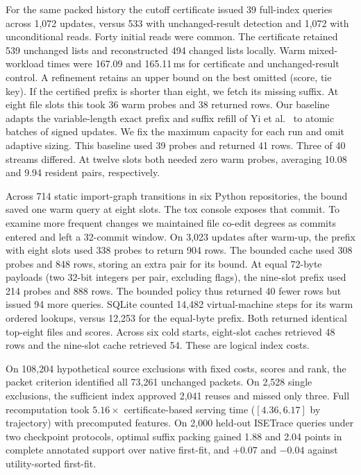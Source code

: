 \documentclass[conference]{IEEEtran}
\begin{document}
For the same packed history the cutoff certificate issued 39 full-index queries across 1,072 updates, versus 533 with unchanged-result detection and 1,072 with unconditional reads. Forty initial reads were common. The certificate retained 539 unchanged lists and reconstructed 494 changed lists locally. Warm mixed-workload times were 167.09 and 165.11\,ms for certificate and unchanged-result control. A refinement retains an upper bound on the best omitted (score, tie key). If the certified prefix is shorter than eight, we fetch its missing suffix. At eight file slots this took 36 warm probes and 38 returned rows. Our baseline adapts the variable-length exact prefix and suffix refill of Yi et al.~\cite{topk} to atomic batches of signed updates. We fix the maximum capacity for each run and omit adaptive sizing. This baseline used 39 probes and returned 41 rows. Three of 40 streams differed. At twelve slots both needed zero warm probes, averaging 10.08 and 9.94 resident pairs, respectively.

Across 714 static import-graph transitions in six Python repositories, the bound saved one warm query at eight slots. The tox console exposes that commit. To examine more frequent changes we maintained file co-edit degrees as commits entered and left a 32-commit window. On 3,023 updates after warm-up, the prefix with eight slots used 338 probes to return 904 rows. The bounded cache used 308 probes and 848 rows, storing an extra pair for its bound. At equal 72-byte payloads (two 32-bit integers per pair, excluding flags), the nine-slot prefix used 214 probes and 888 rows. The bounded policy thus returned 40 fewer rows but issued 94 more queries. SQLite counted 14,482 virtual-machine steps for its warm ordered lookups, versus 12,253 for the equal-byte prefix. Both returned identical top-eight files and scores. Across six cold starts, eight-slot caches retrieved 48 rows and the nine-slot cache retrieved 54. These are logical index costs.

On 108,204 hypothetical source exclusions with fixed costs, scores and rank, the packet criterion identified all 73,261 unchanged packets. On 2,528 single exclusions, the sufficient index approved 2,041 reuses and missed only three. Full recomputation took $5.16\times$ certificate-based serving time ($[4.36,6.17]$ by trajectory) with precomputed features. On 2,000 held-out ISETrace queries under two checkpoint protocols, optimal suffix packing gained 1.88 and 2.04 points in complete annotated support over native first-fit, and $+0.07$ and $-0.04$ against utility-sorted first-fit.
\end{document}
